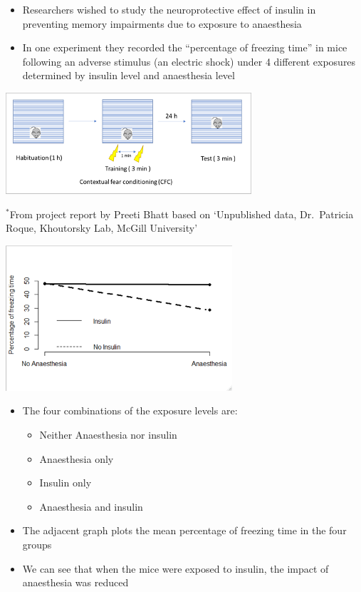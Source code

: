 \documentclass[
]{book}
\providecommand{\tightlist}{%
  \setlength{\itemsep}{0pt}\setlength{\parskip}{0pt}}
\begin{document}
\begin{itemize}
\tightlist
\item
  Researchers wished to study the neuroprotective effect of insulin in preventing memory impairments due to exposure to anaesthesia
\item
  In one experiment they recorded the ``percentage of freezing time'' in mice following an adverse stimulus (an electric shock) under 4 different exposures determined by insulin level and anaesthesia level
\end{itemize}

\includegraphics[width=0.6\linewidth]{./11_21}

\(^*\)From project report by Preeti Bhatt based on `Unpublished data, Dr.~Patricia Roque, Khoutorsky Lab, McGill University'

\includegraphics[width=0.5\linewidth]{./11_22}

\begin{itemize}
\tightlist
\item
  The four combinations of the exposure levels are:

  \begin{itemize}
  \tightlist
  \item
    Neither Anaesthesia nor insulin
  \item
    Anaesthesia only
  \item
    Insulin only
  \item
    Anaesthesia and insulin
  \end{itemize}
\item
  The adjacent graph plots the mean percentage of freezing time in the four groups
\item
  We can see that when the mice were exposed to insulin, the impact of anaesthesia was reduced
\end{itemize}
\end{document}
